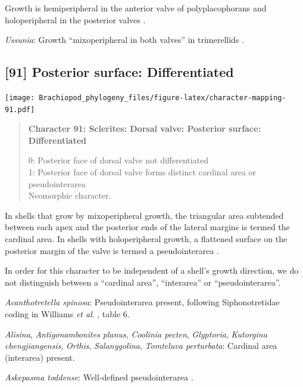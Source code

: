 \documentclass[openany]{book}
\begin{document}
Growth is hemiperipheral in the anterior valve of polyplacophorans and
holoperipheral in the posterior valves \citep{Schwabe2010, Connors2012}.

\hypertarget{Ussunia-coding-90}{}
\emph{Ussunia}: Growth ``mixoperipheral in both valves'' in trimerellids
\citep{Williams2000LinguliformeaCraniiformea, Popov1997}.

\subsection*{{[}91{]} Posterior surface:
Differentiated}\label{posterior-surface-differentiated}

\texttt{[image: Brachiopod\_phylogeny\_files/figure-latex/character-mapping-91.pdf]}

\begin{quote}
\textbf{Character 91: Sclerites: Dorsal valve: Posterior surface:
Differentiated}

0: Posterior face of dorsal valve not differentiated\\
1: Posterior face of dorsal valve forms distinct cardinal area or
pseudointerarea\\
Neomorphic character.
\end{quote}

In shells that grow by mixoperipheral growth, the triangular area
subtended between each apex and the posterior ends of the lateral
margins is termed the cardinal area. In shells with holoperipheral
growth, a flattened surface on the posterior margin of the valve is
termed a pseudointerarea
\citep[paraphrasing][]{Williams1997Introduction}.

In order for this character to be independent of a shell's growth
direction, we do not distinguish between a ``cardinal area'',
``interarea'' or ``pseudointerarea''.

\hypertarget{Acanthotretella_spinosa-coding-91}{}
\emph{Acanthotretella spinosa}: Pseudointerarea present, following
Siphonotretidae coding in Williams \emph{et al}.
\citeyearpar{Williams2000LinguliformeaCraniiformea}, table 6.

\hypertarget{Alisina-coding-91}{}
\emph{Alisina}, \emph{Antigonambonites planus}, \emph{Coolinia pecten},
\emph{Glyptoria}, \emph{Kutorgina chengjiangensis}, \emph{Orthis},
\emph{Salanygolina}, \emph{Tomteluva perturbata}: Cardinal area
(interarea) present.

\hypertarget{Askepasma_toddense-coding-91}{}
\emph{Askepasma toddense}: Well-defined pseudointerarea
\citep[p153]{Williams2000LinguliformeaCraniiformea}.
\end{document}
